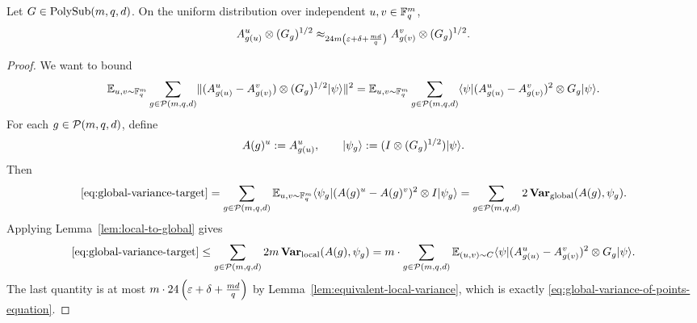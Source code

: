 \begin{lemma}\label{lem:global-variance-of-points}
	\leanok
	Let $G \in \mathrm{PolySub}(m,q,d)$. On the uniform distribution over independent $u,v \in \mathbb{F}_q^m$,
	\begin{equation}
		A^u_{g(u)} \otimes (G_g)^{1/2}
		\approx_{24m\left(\varepsilon+\delta+\frac{md}{q}\right)}
		A^v_{g(v)} \otimes (G_g)^{1/2}.
		\label{eq:global-variance-of-points-equation}
	\end{equation}
\end{lemma}
\begin{proof}
	\leanok
	We want to bound
	\begin{equation}
		\mathbb{E}_{u,v \sim \mathbb{F}_q^m} \sum_{g \in \mathcal{P}(m,q,d)} \lVert (A^u_{g(u)}-A^v_{g(v)}) \otimes (G_g)^{1/2} \lvert \psi \rangle \rVert^2
		=
		\mathbb{E}_{u,v \sim \mathbb{F}_q^m} \sum_{g \in \mathcal{P}(m,q,d)} \langle \psi \rvert (A^u_{g(u)}-A^v_{g(v)})^2 \otimes G_g \lvert \psi \rangle.
		\label{eq:global-variance-target}
	\end{equation}
	For each $g \in \mathcal{P}(m,q,d)$, define
	\[
		A(g)^u := A^u_{g(u)},
		\qquad
		\lvert \psi_g \rangle := (I \otimes (G_g)^{1/2})\lvert \psi \rangle.
	\]
	Then
	\[
		\eqref{eq:global-variance-target}
		=
		\sum_{g \in \mathcal{P}(m,q,d)} \mathbb{E}_{u,v \sim \mathbb{F}_q^m} \langle \psi_g \rvert (A(g)^u-A(g)^v)^2 \otimes I \lvert \psi_g \rangle
		=
		\sum_{g \in \mathcal{P}(m,q,d)} 2\,\mathbf{Var}_{\mathrm{global}}(A(g),\psi_g).
	\]
	Applying Lemma~\ref{lem:local-to-global} gives
	\[
		\eqref{eq:global-variance-target}
		\le
		\sum_{g \in \mathcal{P}(m,q,d)} 2m\,\mathbf{Var}_{\mathrm{local}}(A(g),\psi_g)
		=
		m \cdot \sum_{g \in \mathcal{P}(m,q,d)} \mathbb{E}_{(u,v)\sim C} \langle \psi \rvert (A^u_{g(u)}-A^v_{g(v)})^2 \otimes G_g \lvert \psi \rangle.
	\]
	The last quantity is at most $m \cdot 24\left(\varepsilon+\delta+\frac{md}{q}\right)$ by Lemma~\ref{lem:equivalent-local-variance}, which is exactly \ref{eq:global-variance-of-points-equation}.
\end{proof}
